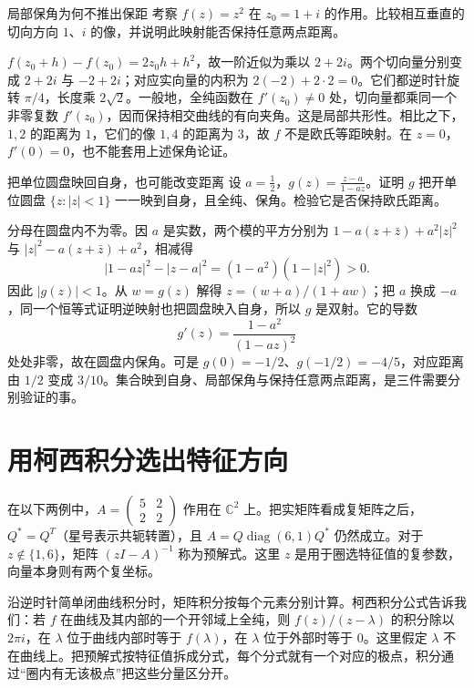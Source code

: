 \begin{example}{局部保角为何不推出保距}
考察 $f(z)=z^2$ 在 $z_0=1+i$ 的作用。比较相互垂直的切向方向 $1$、$i$ 的像，并说明此映射能否保持任意两点距离。
\end{example}
\begin{solution}
$f(z_0+h)-f(z_0)=2z_0h+h^2$，故一阶近似为乘以 $2+2i$。两个切向量分别变成 $2+2i$ 与 $-2+2i$；对应实向量的内积为 $2(-2)+2\cdot2=0$。它们都逆时针旋转 $\pi/4$，长度乘 $2\sqrt2$。一般地，全纯函数在 $f'(z_0)\ne0$ 处，切向量都乘同一个非零复数 $f'(z_0)$，因而保持相交曲线的有向夹角。这是局部共形性。相比之下，$1,2$ 的距离为 $1$，它们的像 $1,4$ 的距离为 $3$，故 $f$ 不是欧氏等距映射。在 $z=0$，$f'(0)=0$，也不能套用上述保角论证。
\end{solution}

\begin{example}{把单位圆盘映回自身，也可能改变距离}
设 $a=\frac12$，$g(z)=\frac{z-a}{1-az}$。证明 $g$ 把开单位圆盘 $\{z:|z|<1\}$ 一一映到自身，且全纯、保角。检验它是否保持欧氏距离。
\end{example}
\begin{solution}
分母在圆盘内不为零。因 $a$ 是实数，两个模的平方分别为 $1-a(z+\bar z)+a^2|z|^2$ 与 $|z|^2-a(z+\bar z)+a^2$，相减得
\[
 |1-az|^2-|z-a|^2=(1-a^2)(1-|z|^2)>0.
\]
因此 $|g(z)|<1$。从 $w=g(z)$ 解得 $z=(w+a)/(1+aw)$；把 $a$ 换成 $-a$，同一个恒等式证明逆映射也把圆盘映入自身，所以 $g$ 是双射。它的导数
\[
 g'(z)=\frac{1-a^2}{(1-az)^2}
\]
处处非零，故在圆盘内保角。可是 $g(0)=-1/2$、$g(-1/2)=-4/5$，对应距离由 $1/2$ 变成 $3/10$。集合映到自身、局部保角与保持任意两点距离，是三件需要分别验证的事。
\end{solution}

\section{用柯西积分选出特征方向}

在以下两例中，$A=\begin{pmatrix}5&2\\2&2\end{pmatrix}$ 作用在 $\mathbb C^2$ 上。把实矩阵看成复矩阵之后，$Q^*=Q^T$（星号表示共轭转置），且 $A=Q\operatorname{diag}(6,1)Q^*$ 仍然成立。对于 $z\notin\{1,6\}$，矩阵 $(zI-A)^{-1}$ 称为预解式。这里 $z$ 是用于圈选特征值的复参数，向量本身则有两个复坐标。

沿逆时针简单闭曲线积分时，矩阵积分按每个元素分别计算。柯西积分公式告诉我们：若 $f$ 在曲线及其内部的一个开邻域上全纯，则 $f(z)/(z-\lambda)$ 的积分除以 $2\pi i$，在 $\lambda$ 位于曲线内部时等于 $f(\lambda)$，在 $\lambda$ 位于外部时等于 $0$。这里假定 $\lambda$ 不在曲线上。把预解式按特征值拆成分式，每个分式就有一个对应的极点，积分通过“圈内有无该极点”把这些分量区分开。

